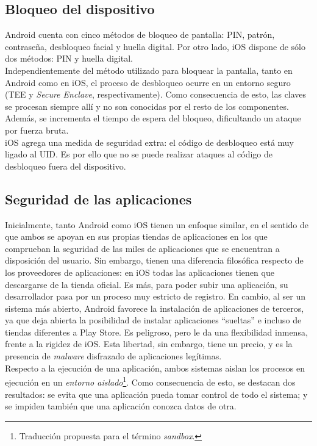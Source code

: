 \subsection{Bloqueo del dispositivo}
Android cuenta con cinco métodos de bloqueo de pantalla: PIN, patrón, contraseña, desbloqueo facial y huella digital. Por otro lado, iOS dispone de sólo dos métodos: PIN y huella digital.\\

Independientemente del método utilizado para bloquear la pantalla, tanto en Android como en iOS, el proceso de desbloqueo ocurre en un entorno seguro (TEE y \emph{Secure Enclave}, respectivamente). Como consecuencia de esto, las claves se procesan siempre allí y no son conocidas por el resto de los componentes. Además, se incrementa el tiempo de espera del bloqueo, dificultando un ataque por fuerza bruta.\\

iOS agrega una medida de seguridad extra: el código de desbloqueo está muy ligado al UID. Es por ello que no se puede realizar ataques al código de desbloqueo fuera del dispositivo.
\subsection{Seguridad de las aplicaciones}
Inicialmente, tanto Android como iOS tienen un enfoque similar, en el sentido de que ambos se apoyan en sus propias tiendas de aplicaciones en los que comprueban la seguridad de las miles de aplicaciones que se encuentran a disposición del usuario. Sin embargo, tienen una diferencia filosófica respecto de los proveedores de aplicaciones: en iOS todas las aplicaciones tienen que descargarse de la tienda oficial. Es más, para poder subir una aplicación, su desarrollador pasa por un proceso muy estricto de registro. En cambio, al ser un sistema más abierto, Android favorece la instalación de aplicaciones de terceros, ya que deja abierta la posibilidad de instalar aplicaciones ``sueltas'' e incluso de tiendas diferentes a Play Store. Es peligroso, pero le da una flexibilidad inmensa, frente a la rigidez de iOS. Esta libertad, sin embargo, tiene un precio, y es la presencia de \emph{malware} disfrazado de aplicaciones legítimas.\\

Respecto a la ejecución de una aplicación, ambos sistemas aislan los procesos en ejecución en un \emph{entorno aislado}\footnote{Traducción propuesta para el término \textit{sandbox}.}. Como consecuencia de esto, se destacan dos resultados: se evita que una aplicación pueda tomar control de todo el sistema; y se impiden también que una aplicación conozca datos de otra.\\

